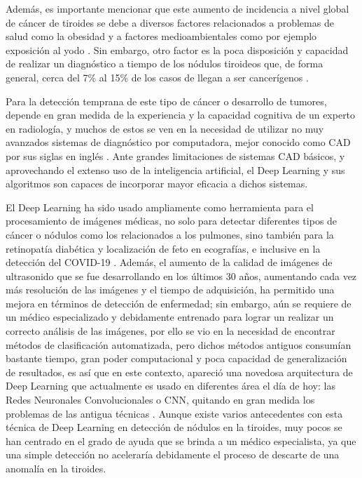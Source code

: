 Además, es importante mencionar que este aumento de incidencia a nivel global de cáncer de tiroides se debe a diversos factores relacionados a problemas de salud como la obesidad y a factores medioambientales como por ejemplo exposición al yodo \parencite{pr_kim2020geoinflu}. Sin embargo, otro factor es la poca disposición y capacidad de realizar un diagnóstico a tiempo de los nódulos tiroideos que, de forma general, cerca del 7\% al 15\% de los casos de llegan a ser cancerígenos \parencite{pr_haugen2016amethy}.

Para la detección temprana de este tipo de cáncer o desarrollo de tumores, depende en gran medida de la experiencia y la capacidad cognitiva de un experto en radiología, y muchos de estos se ven en la necesidad de utilizar no muy avanzados sistemas de diagnóstico por computadora, mejor conocido como CAD por sus siglas en inglés \parencite{pr_zhu2021agendlframew}. Ante grandes limitaciones de sistemas CAD básicos, y aprovechando el extenso uso de la inteligencia artificial, el Deep Learning y sus algoritmos son capaces de incorporar mayor eficacia a dichos sistemas.

El Deep Learning ha sido usado ampliamente como herramienta para el procesamiento de imágenes médicas, no solo para detectar diferentes tipos de cáncer o nódulos como los relacionados a los pulmones, sino también para la retinopatía diabética y localización de feto en ecografías, e inclusive en la detección del COVID-19 \parencite{pr_bhatta2021medimage}. Además, el aumento de la calidad de imágenes de ultrasonido que se fue desarrollando en los últimos 30 años, aumentando cada vez más resolución de las imágenes y el tiempo de adquisición, ha permitido una mejora en términos de detección de enfermedad; sin embargo, aún se requiere de un médico especializado y debidamente entrenado para lograr un realizar un correcto análisis de las imágenes, por ello se vio en la necesidad de encontrar métodos de clasificación automatizada, pero dichos métodos antiguos consumían bastante tiempo, gran poder computacional y poca capacidad de generalización de resultados, es así que en este contexto, apareció una novedosa arquitectura de Deep Learning que actualmente es usado en diferentes área el día de hoy: las Redes Neuronales Convolucionales o CNN, quitando en gran medida los problemas de las antigua técnicas \parencite{pr_signgh20203ddl}. Aunque existe varios antecedentes con esta técnica de Deep Learning en detección de nódulos en la tiroides, muy pocos se han centrado en el grado de ayuda que se brinda a un médico especialista, ya que una simple detección no aceleraría debidamente el proceso de descarte de una anomalía en la tiroides.


